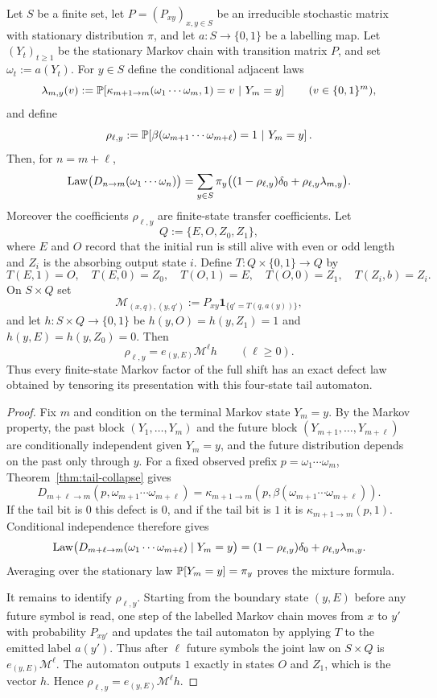\begin{theorem}
\label{thm:finite-state-factor-law}
Let $S$ be a finite set, let $P=(P_{xy})_{x,y\in S}$ be an irreducible
stochastic matrix with stationary distribution $\pi$, and let
$a:S\to\{0,1\}$ be a labelling map.  Let $(Y_t)_{t\ge 1}$ be the stationary
Markov chain with transition matrix $P$, and set $\omega_t:=a(Y_t)$.  For
$y\in S$ define the conditional adjacent laws
\[
\lambda_{m,y}(v)
:=
\mathbb{P}\!\left[
\kappa_{m+1\to m}(\omega_1\cdots\omega_m,1)=v
\ \middle|\ Y_m=y
\right]
\qquad (v\in\{0,1\}^m),
\]
and define
\[
\rho_{\ell,y}:=
\mathbb{P}\!\left[
\beta(\omega_{m+1}\cdots\omega_{m+\ell})=1
\ \middle|\ Y_m=y
\right].
\]
Then, for $n=m+\ell$,
\[
\operatorname{Law}\bigl(D_{n\to m}(\omega_1\cdots\omega_n)\bigr)
=
\sum_{y\in S}\pi_y\bigl((1-\rho_{\ell,y})\delta_0+
\rho_{\ell,y}\lambda_{m,y}\bigr).
\]
Moreover the coefficients $\rho_{\ell,y}$ are finite-state transfer
coefficients.  Let
\[
Q:=\{E,O,Z_0,Z_1\},
\]
where $E$ and $O$ record that the initial run is still alive with even or odd
length and $Z_i$ is the absorbing output state $i$.  Define
$T:Q\times\{0,1\}\to Q$ by
\[
T(E,1)=O,
\quad
T(E,0)=Z_0,
\quad
T(O,1)=E,
\quad
T(O,0)=Z_1,
\quad
T(Z_i,b)=Z_i.
\]
On $S\times Q$ set
\[
\mathcal M_{(x,q),(y,q')}:=P_{xy}\mathbf{1}_{\{q'=T(q,a(y))\}},
\]
and let $h:S\times Q\to\{0,1\}$ be $h(y,O)=h(y,Z_1)=1$ and
$h(y,E)=h(y,Z_0)=0$.  Then
\[
\rho_{\ell,y}=e_{(y,E)}\mathcal M^\ell h
\qquad (\ell\ge 0).
\]
Thus every finite-state Markov factor of the full shift has an exact defect law
obtained by tensoring its presentation with this four-state tail automaton.
\end{theorem}

\begin{proof}
Fix $m$ and condition on the terminal Markov state $Y_m=y$.  By the Markov
property, the past block $(Y_1,\dots,Y_m)$ and the future block
$(Y_{m+1},\dots,Y_{m+\ell})$ are conditionally independent given $Y_m=y$,
and the future distribution depends on the past only through $y$.  For a fixed
observed prefix $p=\omega_1\cdots\omega_m$, Theorem~\ref{thm:tail-collapse}
gives
\[
D_{m+\ell\to m}(p,\omega_{m+1}\cdots\omega_{m+\ell})
=
\kappa_{m+1\to m}(p,\beta(\omega_{m+1}\cdots\omega_{m+\ell})).
\]
If the tail bit is $0$ this defect is $0$, and if the tail bit is $1$ it is
$\kappa_{m+1\to m}(p,1)$.  Conditional independence therefore gives
\[
\operatorname{Law}\bigl(D_{m+\ell\to m}(\omega_1\cdots\omega_{m+\ell})\mid Y_m=y\bigr)
=(1-\rho_{\ell,y})\delta_0+
\rho_{\ell,y}\lambda_{m,y}.
\]
Averaging over the stationary law $\mathbb{P}[Y_m=y]=\pi_y$ proves the mixture
formula.

It remains to identify $\rho_{\ell,y}$.  Starting from the boundary state
$(y,E)$ before any future symbol is read, one step of the labelled Markov chain
moves from $x$ to $y'$ with probability $P_{xy'}$ and updates the tail automaton
by applying $T$ to the emitted label $a(y')$.  Thus after $\ell$ future symbols
the joint law on $S\times Q$ is $e_{(y,E)}\mathcal M^\ell$.  The automaton
outputs $1$ exactly in states $O$ and $Z_1$, which is the vector $h$.  Hence
$\rho_{\ell,y}=e_{(y,E)}\mathcal M^\ell h$.
\end{proof}

